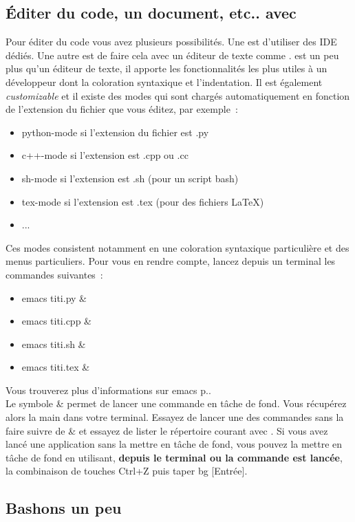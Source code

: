 \subsection{Éditer du code, un document, etc.. avec \emacs}

Pour éditer du code vous avez plusieurs possibilités. Une est d'utiliser des IDE dédiés. Une autre est de faire cela avec un éditeur de texte comme \emacs. \emacs est un peu plus qu'un éditeur de texte, il apporte les fonctionnalités les plus utiles à un développeur dont la coloration syntaxique et l'indentation. Il est également \emph{customizable} et il existe des modes qui sont chargés automatiquement en fonction de l'extension du fichier que vous éditez, par exemple~:
\begin{itemize}
\item python-mode si l'extension du fichier est .py
\item c++-mode si l'extension est .cpp ou .cc
\item sh-mode si l'extension est .sh (pour un script bash)
\item tex-mode si l'extension est .tex (pour des fichiers \LaTeX)
\item ...
\end{itemize}
Ces modes consistent notamment en une coloration syntaxique particulière et des menus particuliers. Pour vous en rendre compte, lancez depuis un terminal les commandes suivantes~:
\begin{itemize}
\item emacs titi.py \&
\item emacs titi.cpp \&
\item emacs titi.sh \&
\item emacs titi.tex \&
\end{itemize}
Vous trouverez plus d'informations sur emacs p.\pageref{sec:emacs}.\\

Le symbole \& permet de lancer une commande en tâche de fond. Vous récupérez alors la main dans votre terminal. Essayez de lancer une des commandes sans la faire suivre de \& et essayez de lister le répertoire courant avec \ls. Si vous avez lancé une application sans la mettre en tâche de fond, vous pouvez la mettre en tâche de fond en utilisant, \textbf{depuis le terminal ou la commande est lancée}, la combinaison de touches Ctrl+Z puis taper bg [Entrée].

\subsection{Bashons un peu}

